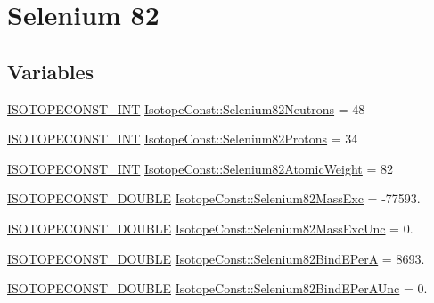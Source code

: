 \hypertarget{group___isotope_const-_selenium-_se82}{}\section{Selenium 82}
\label{group___isotope_const-_selenium-_se82}
\subsection*{Variables}
\begin{DoxyCompactItemize}
\item 
\mbox{\hyperlink{group___isotope_const-_macros_ga5f18360b3e99483a35c32d789e62621c}{I\+S\+O\+T\+O\+P\+E\+C\+O\+N\+S\+T\+\_\+\+I\+NT}} \mbox{\hyperlink{group___isotope_const-_selenium-_se82_ga0811c68900882781447ef671025ab75e}{Isotope\+Const\+::\+Selenium82\+Neutrons}} = 48
\item 
\mbox{\hyperlink{group___isotope_const-_macros_ga5f18360b3e99483a35c32d789e62621c}{I\+S\+O\+T\+O\+P\+E\+C\+O\+N\+S\+T\+\_\+\+I\+NT}} \mbox{\hyperlink{group___isotope_const-_selenium-_se82_ga6bc74e228f83b6f1fed2179a7b1a9330}{Isotope\+Const\+::\+Selenium82\+Protons}} = 34
\item 
\mbox{\hyperlink{group___isotope_const-_macros_ga5f18360b3e99483a35c32d789e62621c}{I\+S\+O\+T\+O\+P\+E\+C\+O\+N\+S\+T\+\_\+\+I\+NT}} \mbox{\hyperlink{group___isotope_const-_selenium-_se82_ga28967a9a2c307d061bfd71a9a332f511}{Isotope\+Const\+::\+Selenium82\+Atomic\+Weight}} = 82
\item 
\mbox{\hyperlink{group___isotope_const-_macros_ga8f45a7272ce02c0b4c65c44636ed719a}{I\+S\+O\+T\+O\+P\+E\+C\+O\+N\+S\+T\+\_\+\+D\+O\+U\+B\+LE}} \mbox{\hyperlink{group___isotope_const-_selenium-_se82_ga6230b94de5112374010dfd0cd6a087a8}{Isotope\+Const\+::\+Selenium82\+Mass\+Exc}} = -\/77593.
\item 
\mbox{\hyperlink{group___isotope_const-_macros_ga8f45a7272ce02c0b4c65c44636ed719a}{I\+S\+O\+T\+O\+P\+E\+C\+O\+N\+S\+T\+\_\+\+D\+O\+U\+B\+LE}} \mbox{\hyperlink{group___isotope_const-_selenium-_se82_gadd9419793c5857351a8528e1d0a1f086}{Isotope\+Const\+::\+Selenium82\+Mass\+Exc\+Unc}} = 0.
\item 
\mbox{\hyperlink{group___isotope_const-_macros_ga8f45a7272ce02c0b4c65c44636ed719a}{I\+S\+O\+T\+O\+P\+E\+C\+O\+N\+S\+T\+\_\+\+D\+O\+U\+B\+LE}} \mbox{\hyperlink{group___isotope_const-_selenium-_se82_ga30b94367b4b6f26e2409717985e87a25}{Isotope\+Const\+::\+Selenium82\+Bind\+E\+PerA}} = 8693.
\item 
\mbox{\hyperlink{group___isotope_const-_macros_ga8f45a7272ce02c0b4c65c44636ed719a}{I\+S\+O\+T\+O\+P\+E\+C\+O\+N\+S\+T\+\_\+\+D\+O\+U\+B\+LE}} \mbox{\hyperlink{group___isotope_const-_selenium-_se82_ga966981dd3e34814e9c7b18c5cb5135aa}{Isotope\+Const\+::\+Selenium82\+Bind\+E\+Per\+A\+Unc}} = 0.

\end{DoxyCompactItemize}

